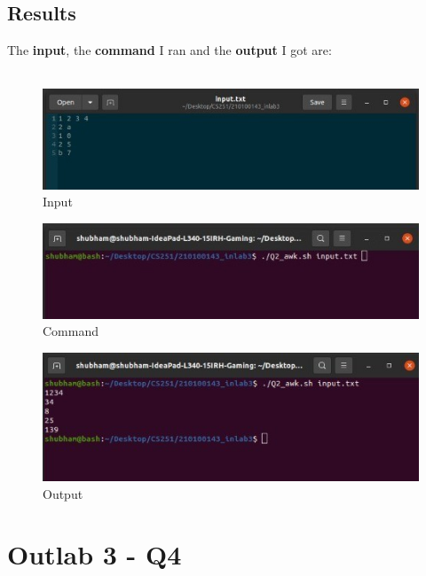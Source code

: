 \documentclass[12pt]{article}
\begin{document}
\subsection{Results}
\vspace*{1em}
The \textbf{input}, the \textbf{command} I ran and the \textbf{output} I got are:\\\\
\begin{figure}[h]
    \includegraphics[width=\textwidth]{Q2_input.jpeg}
    \caption[]{Input}
\end{figure}
\vspace*{1em}
\begin{figure}[h]
    \includegraphics[width=\textwidth]{Q2_command.jpeg}
    \caption[]{Command}
\end{figure}
\vspace*{1em}
\begin{figure}[h]
    \includegraphics[width=\textwidth]{Q2_output.jpeg}
    \caption[]{Output}
\end{figure}
\newpage

\section{Outlab 3 - Q4}
\end{document}
